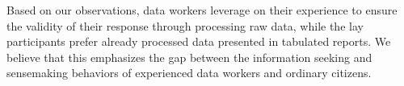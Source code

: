\documentclass{sigchi}
\begin{document}
Based on our observations, data workers leverage on their experience to ensure the validity of their response through processing raw data, while the lay participants prefer already processed data presented in tabulated reports. We believe that this emphasizes the gap between the information seeking and sensemaking behaviors of experienced data workers and ordinary citizens.


\end{document}
